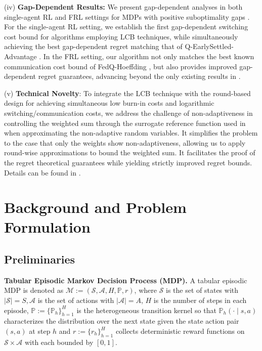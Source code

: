 \documentclass{article}
\begin{document}
(iv) \textbf{Gap-Dependent Results:} We present gap-dependent analyses in both single-agent RL and FRL settings for MDPs with positive suboptimality gaps \citep{wagenmaker2022first,zanette2019tighter}. For the single-agent RL setting, we establish the first gap-dependent switching cost bound for algorithms employing LCB techniques, while simultaneously achieving the best gap-dependent regret matching that of Q-EarlySettled-Advantage \cite{zheng2024gap}. In the FRL setting, our algorithm not only matches the best known communication cost bound of FedQ-Hoeffding \cite{zhang2025gapdependent}, but also provides improved gap-dependent regret guarantees, advancing beyond the only existing results in \cite{zhang2025gapdependent}.

(v) \textbf{Technical Novelty}: To integrate the LCB technique with the round-based design for achieving simultaneous low burn-in costs and logarithmic switching/communication costs, we address the challenge of non-adaptiveness in controlling the weighted sum through the surrogate reference function used in  when approximating the non-adaptive random variables. It simplifies the problem to the case that only the weights show non-adaptiveness, allowing us to apply round-wise approximations to bound the weighted sum. It facilitates the proof of the regret theoretical guarantees while yielding strictly improved regret bounds. Details can be found in .

\section{Background and Problem Formulation}\label{sec:background}
\subsection{Preliminaries}
\textbf{Tabular Episodic Markov Decision Process (MDP).}
A tabular episodic MDP is denoted as $\mathcal{M}:=(\mathcal{S}, \mathcal{A}, H, \mathbb{P}, r)$, where $\mathcal{S}$ is the set of states with $|\mathcal{S}|=S, \mathcal{A}$ is the set of actions with $|\mathcal{A}|=A$, $H$ is the number of steps in each episode, $\mathbb{P}:=\{\mathbb{P}_h\}_{h=1}^H$ is the heterogeneous transition kernel
so that $\mathbb{P}_h(\cdot \mid s, a)$ characterizes the distribution over the next state given the state action pair $(s,a)$ at step $h$ and
$r:=\{r_h\}_{h=1}^H$ collects deterministic reward functions on $\mathcal{S}\times \mathcal{A}$ with each bounded by $[0,1]$. 
	
\end{document}
